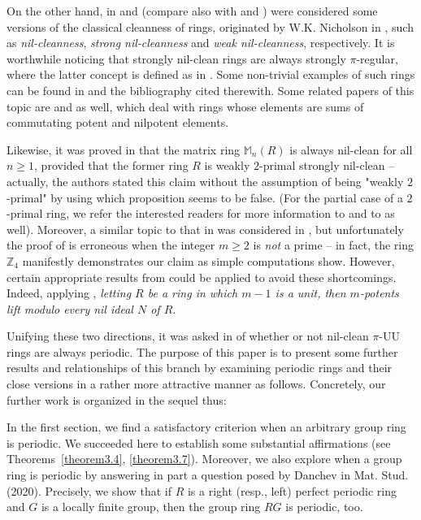 \documentclass[12pt]{amsart}
\theoremstyle{definition}
\theoremstyle{remark}
\numberwithin{equation}{section}
\begin{document}
On the other hand, in \cite{D13} and \cite{BDZ} (compare also with \cite{DL} and \cite{KWZ}) were considered some versions of the classical cleanness of rings, originated by W.K. Nicholson in \cite{N}, such as {\it nil-cleanness}, {\it strong nil-cleanness} and {\it weak nil-cleanness}, respectively. It is worthwhile noticing that strongly nil-clean rings are always strongly $\pi$-regular, where the latter concept is defined as in \cite{L}. Some non-trivial examples of such rings can be found in \cite{HKL} and the bibliography cited therewith. Some related papers of this topic are \cite{BMA} and \cite{Di} as well, which deal with rings whose elements are sums of commutating potent and nilpotent elements.

Likewise, it was proved in \cite[Corollary 3.10]{BMA} that the matrix ring $\mathbb{M}_n(R)$ is always nil-clean for all $n\geq 1$, provided that the former ring $R$ is weakly $2$-primal strongly nil-clean -- actually, the authors stated this claim without the assumption of being "weakly $2$-primal" by using \cite[Proposition 2.7]{NI} which proposition seems to be false. (For the partial case of a $2$-primal ring, we refer the interested readers for more information to \cite{D2} and to \cite{BCDM} as well). Moreover, a similar topic to that in \cite{BMA} was considered in \cite{PDK}, but unfortunately the proof of \cite[Lemma 3.3]{PDK} is erroneous when the integer $m\geq 2$ is {\it not} a prime -- in fact, the ring $\mathbb{Z}_4$ manifestly demonstrates our claim as simple computations show. However, certain appropriate results from \cite{khurana2021lifting} could be applied to avoid these shortcomings. Indeed, applying \cite[Theorem 8]{khurana2021lifting}, {\it letting $R$ be a ring in which $m-1$ is a unit, then $m$-potents lift modulo every nil ideal $N$ of $R$}.

Unifying these two directions, it was asked in \cite[p.9, Question]{CD} of whether or not nil-clean $\pi$-UU rings are always periodic. The purpose of this paper is to present some further results and relationships of this branch by examining periodic rings and their close versions in a rather more attractive manner as follows. Concretely, our further work is organized in the sequel thus:

In the first section, we find a satisfactory criterion when an arbitrary group ring is periodic. We succeeded here to establish some substantial affirmations (see Theorems~\ref{theorem3.4}, \ref{theorem3.7}). Moreover, we also explore when a group ring is periodic by answering in part a question posed by Danchev in Mat. Stud. (2020). Precisely, we show that if $R$ is a right (resp., left) perfect periodic ring and $G$ is a locally finite group, then the group ring $RG$ is periodic, too.
\end{document}
